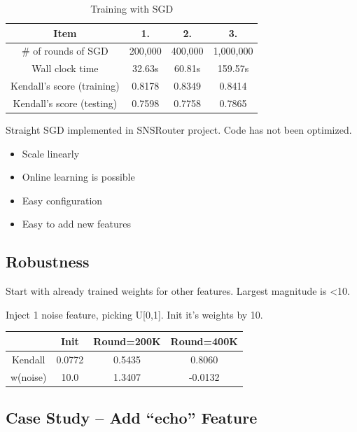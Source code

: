 \documentclass{sig-alternate}
\begin{document}
\begin{table}
	\centering
	\caption{Training with SGD}
	\begin{tabular}{|c|c|c|c|}
	\hline
	Item & 1. & 2. & 3. \\
	\hline
	\# of rounds of SGD & 200,000 & 400,000 & 1,000,000\\
	Wall clock time & 32.63s & 60.81s & 159.57s\\
	Kendall's score (training) & 0.8178 & 0.8349 & 0.8414\\
	Kendall's score (testing) & 0.7598 & 0.7758 & 0.7865\\
	\hline
	\end{tabular}
\end{table}

Straight SGD implemented in SNSRouter project. Code has not been optimized.

\begin{itemize}
	\item Scale linearly
	\item Online learning is possible
	\item Easy configuration
	\item Easy to add new features
\end{itemize}

\subsection{Robustness}
\label{sec:Robustness}

Start with already trained weights for
other features. Largest magnitude is <10.

Inject 1 noise feature, picking U[0,1]. Init
it’s weights by 10.

\begin{table}
	\begin{tabular}{|c|c|c|c|}
		\hline 
		& Init & Round=200K & Round=400K \\
		\hline 
Kendall & 0.0772 & 0.5435 & 0.8060 \\
 w(noise) & 10.0 & 1.3407 & -0.0132 \\
		\hline
	\end{tabular}
\end{table}

\subsection{Case Study -- Add ``echo'' Feature}
\label{sec:Case Study -- Add ``echo'' Feature}
\end{document}
